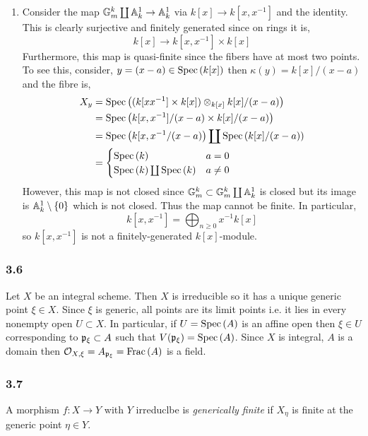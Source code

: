 \documentclass[12pt]{article}
\begin{document}
\begin{enumerate}
\item Consider the map $\mathbb{G}_m^k \coprod \mathbb{A}^1_k \to \mathbb{A}^1_k$ via $k[x] \to k[x,x^{-1}]$ and the identity. This is clearly surjective and finitely generated since on rings it is,
\[ k[x] \to k[x, x^{-1}] \times k[x] \]
Furthermore, this map is quasi-finite since the fibers have at most two points. To see this, consider, $y = (x - a) \in \mathrm{Spec}\left( k[x] \right)$ then $\kappa(y) = k[x]/(x - a)$ and the fibre is,
\begin{align*}
X_y & = \mathrm{Spec}\left( (k[x x^{-1}] \times k[x]) \otimes_{k[x]} k[x]/(x  - a) \right) 
\\
& = \mathrm{Spec}\left( k[x, x^{-1}]/(x - a) \times k[x] / (x - a) \right) 
\\
& = \mathrm{Spec}\left( k[x, x^{-1}/(x - a) \right) \coprod \mathrm{Spec}\left( k[x]/(x - a) \right) 
\\
& = 
\begin{cases}
\mathrm{Spec}\left( k \right) & a = 0
\\
\mathrm{Spec}\left( k \right) \coprod \mathrm{Spec}\left( k \right) & a \neq 0
\end{cases}
\end{align*}
However, this map is not closed since $\mathbb{G}_m^k \subset \mathbb{G}_m^k \coprod \mathbb{A}^1_k$ is closed but its image is $\mathbb{A}^1_k \setminus \{ 0 \}$ which is not closed. Thus the map cannot be finite. In particular,
\[ k[x, x^{-1}] = \bigoplus_{n \ge 0} x^{-1} k[x] \]
so $k[x, x^{-1}]$ is not a finitely-generated $k[x]$-module.  
\end{enumerate}

\subsubsection{3.6}

Let $X$ be an integral scheme. Then $X$ is irreducible so it has a unique generic point $\xi \in X$. Since $\xi$ is generic, all points are its limit points i.e. it lies in every nonempty open $U \subset X$. In particular, if $U = \mathrm{Spec}\left( A \right)$ is an affine open then $\xi \in U$ corresponding to $\mathfrak{p}_\xi \subset A$ such that $V(\mathfrak{p}_\xi) = \mathrm{Spec}\left( A \right)$. Since $X$ is integral, $A$ is a domain then $\mathcal{O}_{X, \xi} = A_{\mathfrak{p}_\xi} = \mathrm{Frac}\left(A\right)$ is a field.

\subsubsection{3.7}

\begin{definition}
A morphism $f : X \to Y$ with $Y$ irreduclbe is \textit{generically finite} if $X_\eta$ is finite at the generic point $\eta \in Y$. 
\end{definition}
\end{document}
